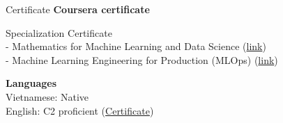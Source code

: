 \documentclass{resume} %
\begin{document}



\begin{rSection}{Certificate}
{\bf Coursera certificate }

Specialization Certificate 
\\ - Mathematics for Machine Learning and Data Science (\href{https://coursera.org/share/ae3f40effbceedf3488075d566a95551}{link})
\\ - Machine Learning Engineering for Production (MLOps) (\href{https://coursera.org/share/ce5ec378a0075b8ffdbd5b235f8a84bd}{link})


{\bf Languages}
\\Vietnamese: Native
\\English: C2 proficient (\href{https://www.efset.org/cert/o5HAWP}{Certificate})
\end{rSection}




\end{document}
